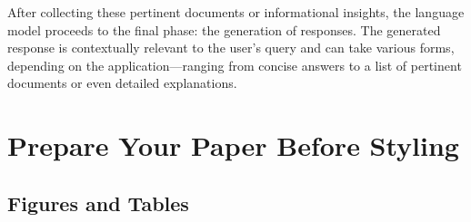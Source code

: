 \documentclass[conference]{IEEEtran}
\begin{document}
After collecting these pertinent documents or informational insights, the language model proceeds to the final phase: the generation of responses. The generated response is contextually relevant to the user's query and can take various forms, depending on the application—ranging from concise answers to a list of pertinent documents or even detailed explanations.



\section{Prepare Your Paper Before Styling}

\subsection{Figures and Tables}


\end{document}
